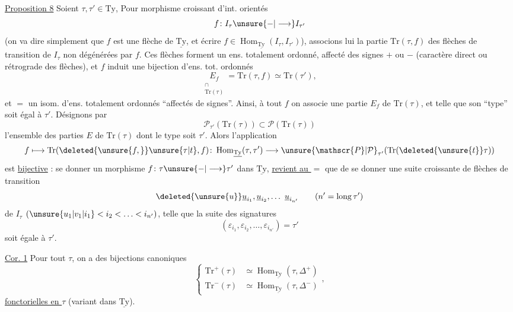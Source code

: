 \uline{Proposition 8} Soient $\tau,\tau'\in\mathrm{Ty}$,  Pour 
morphisme croissant d'int. orientés
\[
 f\colon I_\tau\unsure{\mathbin{-}|\longrightarrow}I_{\tau'}
\]
(on va  dire simplement que $f$ est une flèche
de $\underline{\mathrm{Ty}}$, et écrire $f\in\operatorname{Hom}_{\underline{\mathrm{Ty}}}(I_\tau,I_{\tau'})$),
associons lui la partie $\mathrm{Tr}(\tau,f)$ des
flèches de transition de $I_\tau$ non dégénérées par $f$.
Ces flèches forment un ens.  totalement ordonné,
affecté des signes $+$ ou $-$ (caractère direct ou
rétrograde des flèches), et $f$ induit une 
bijection d'ens. tot. ordonnés
\[
\underset{\substack{\cap\\\mathrm{Tr}(\tau)}}{E_f}=\mathrm{Tr}(\tau,f)\simeq\mathrm{Tr}(\tau'),
\]
et $=$ un isom. d'ens. totalement ordonnés
``affectés de signes''. Ainsi, à tout $f$ on associe
une partie $E_f$ de $\mathrm{Tr}(\tau)$, et telle que
son ``type'' soit égal à $\tau'$. Désignons par
\[
\mathscr{P}_{\tau'}(\mathrm{Tr}(\tau))\subset\mathscr{P}(\mathrm{Tr}(\tau))
\]
l'ensemble des parties $E$ de $\mathrm{Tr}(\tau)$ dont le type soit $\tau'$.
Alors l'application 
\[
 f\longmapsto\mathrm{Tr}(\deleted{\unsure{f,}}\unsure{\tau|t},f)\colon
 \operatorname{Hom}_{\underline{\mathrm{Ty}}}(\tau,\tau')\longrightarrow
 \unsure{\mathscr{P}|\mathcal{P}}_{\tau'}(\mathrm{Tr}(\deleted{\unsure{t}}\tau))
\]
est \uline{bijective} : se donner un morphisme
$f\colon\tau\unsure{\mathbin{-}|\longrightarrow}\tau'$ dans $\underline{\mathrm{Ty}}$, \uline{revient au $=$} que
de se donner une suite  croissante de
flèches de transition
\[
 \deleted{\unsure{u}}\underline{u}_{i_1},\underline{u}_{i_2},\ldots\ \underline{u}_{i_{n'}}
 \qquad(n'=\operatorname{long}\tau')
\]
de $I_\tau$ $(\unsure{u_1|v_1|i_1}<i_2<\ldots<i_{n'})$, telle que
la suite des signatures 
\[
 (\varepsilon_{i_1},\varepsilon_{i_2},\ldots,\varepsilon_{i_{n'}})=\tau'
\]
soit égale à $\tau'$.

\uline{Cor. 1} Pour tout $\tau$, on a des bijections
canoniques
\[
\left\{\begin{aligned}
\mathrm{Tr}^+(\tau)&\simeq\operatorname{Hom}_{\underline{\mathrm{Ty}}}(\tau,\Delta^+)\\
\mathrm{Tr}^-(\tau)&\simeq\operatorname{Hom}_{\underline{\mathrm{Ty}}}(\tau,\Delta^-)
\end{aligned}\right.,
\]
\uline{fonctorielles en $\tau$} (variant dans $\underline{\mathrm{Ty}}$).

